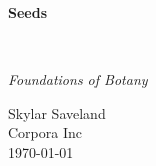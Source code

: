 \clearpage
\vspace*{1.5in}
\begin{center}
  \begin{minipage}{\textwidth}
    \centering
    \Huge\bfseries
    \linespread{1.25}\selectfont
  Seeds
  \end{minipage}
  \\[3em]
  {\Large\itshape\linespread{1.3}\selectfont
  Foundations of Botany\par}
  \vfill
  {\large Skylar Saveland}
  \\[1em]
  {\large Corpora Inc}
  \\[1em]
  {\large \today}
\end{center}
\clearpage
